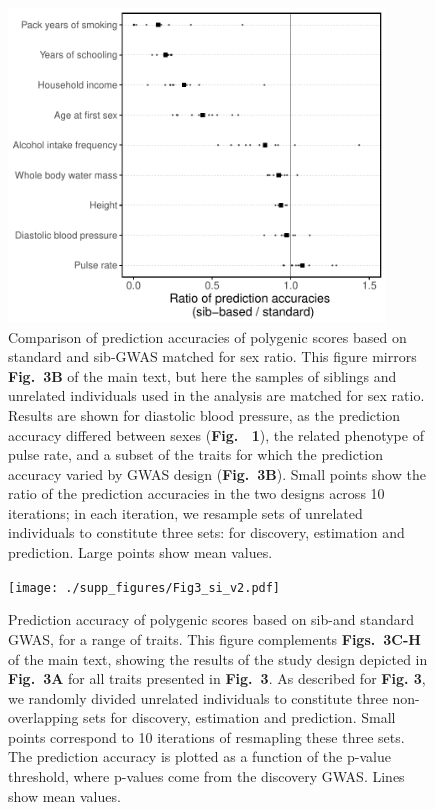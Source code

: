 \documentclass[hidelinks, 12pt]{article}
\begin{document}
\pagebreak

\begin{figure}[h]
\centering
\includegraphics[width=10cm]{./supp_figures/sex_matched_panel_A_all_iters}
\caption[Comparison of prediction accuracies of polygenic scores based on standard and sib-GWAS matched for sex ratio]{\small Comparison of prediction accuracies of polygenic scores based on standard and sib-GWAS matched for sex ratio. This figure mirrors {\bf Fig.~3B} of the main text, but here the samples of siblings and unrelated individuals used in the analysis are matched for sex ratio. Results are shown for diastolic blood pressure, as the prediction accuracy differed between sexes ({\bf Fig. ~1}), the related phenotype of pulse rate, and a subset of the traits for which the prediction accuracy varied by GWAS design ({\bf Fig.~3B}). Small points show the ratio of the prediction accuracies in the two designs across 10 iterations; in each iteration, we resample sets of unrelated individuals to constitute three sets: for discovery, estimation and prediction. Large points show mean values.}
\label{fig:R2_ratio_with_sex_ratio_matched}
\end{figure}


\pagebreak

\begin{figure}[h!]
\centering
\texttt{[image: ./supp\_figures/Fig3\_si\_v2.pdf]}
\caption[Prediction accuracy of polygenic scores based on sib- and standard GWAS, for a range of traits]{\small Prediction accuracy of polygenic scores based on sib-and standard GWAS, for a range of traits. This figure complements {\bf Figs.~3C-H} of the main text, showing the results of the study design depicted in {\bf Fig.~3A} for all traits presented in {\bf Fig.~3}. As described for {\bf Fig. 3}, we randomly divided unrelated individuals to constitute three non-overlapping sets for discovery, estimation and prediction. Small points correspond to 10 iterations of resmapling these three sets. The prediction accuracy is plotted as a function of the p-value threshold, where p-values come from the discovery GWAS. Lines show mean values.}
\end{figure}
\end{document}
